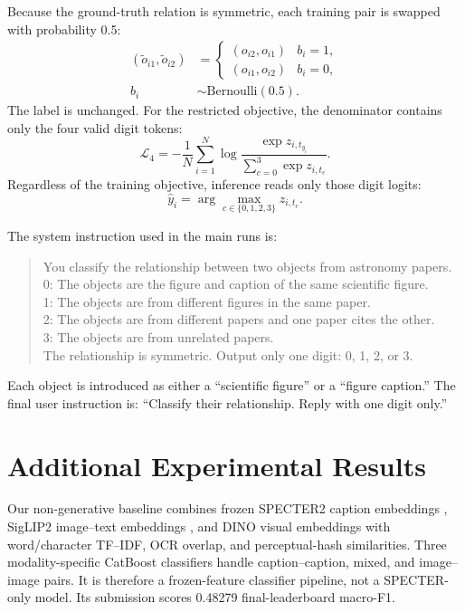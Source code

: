 \documentclass[11pt]{article}
\begin{document}
Because the ground-truth relation is symmetric, each training pair is swapped with probability 0.5:
\begin{equation}
\begin{aligned}
(\tilde{o}_{i1},\tilde{o}_{i2})
&=\begin{cases}
(o_{i2},o_{i1}) & b_i=1,\\
(o_{i1},o_{i2}) & b_i=0,
\end{cases}\\[-2pt]
b_i&\sim\mathrm{Bernoulli}(0.5).
\end{aligned}
\end{equation}
The label is unchanged.  For the restricted objective, the denominator contains only the four valid digit tokens:
\begin{equation}
\mathcal{L}_{4}=-\frac{1}{N}\sum_{i=1}^{N}
\log\frac{\exp z_{i,t_{y_i}}}{\sum_{c=0}^{3}\exp z_{i,t_c}}.
\end{equation}
Regardless of the training objective, inference reads only those digit logits:
\begin{equation}
\hat{y}_i=\arg\max_{c\in\{0,1,2,3\}}z_{i,t_c}.
\end{equation}

The system instruction used in the main runs is:
\begin{quote}\small
You classify the relationship between two objects from astronomy papers.\\
0: The objects are the figure and caption of the same scientific figure.\\
1: The objects are from different figures in the same paper.\\
2: The objects are from different papers and one paper cites the other.\\
3: The objects are from unrelated papers.\\
The relationship is symmetric. Output only one digit: 0, 1, 2, or 3.
\end{quote}
Each object is introduced as either a ``scientific figure'' or a ``figure caption.''  The final user instruction is: ``Classify their relationship. Reply with one digit only.''

\section{Additional Experimental Results}
\label{sec:additional-results}

Our non-generative baseline combines frozen SPECTER2 caption embeddings \citep{singh2023scirepeval}, SigLIP2 image--text embeddings \citep{tschannen2025siglip2}, and DINO visual embeddings \citep{simeoni2025dinov3} with word/character TF--IDF, OCR overlap, and perceptual-hash similarities.  Three modality-specific CatBoost classifiers handle caption--caption, mixed, and image--image pairs.  It is therefore a frozen-feature classifier pipeline, not a SPECTER-only model.  Its submission scores 0.48279 final-leaderboard macro-F1.
\end{document}
